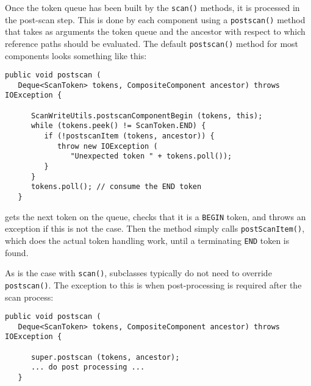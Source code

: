 \documentclass{article}
\begin{document}
Once the token queue has been built by the {\tt scan()} methods, it is
processed in the post-scan step. This is done by each component using
a {\tt postscan()} method that takes as arguments the token queue and
the ancestor with respect to which reference paths should be
evaluated. The default {\tt postscan()} method for most components
looks something like this:
\begin{lstlisting}[]
   public void postscan (
   Deque<ScanToken> tokens, CompositeComponent ancestor) throws IOException {

      ScanWriteUtils.postscanComponentBegin (tokens, this);
      while (tokens.peek() != ScanToken.END) {
         if (!postscanItem (tokens, ancestor)) {
            throw new IOException (
               "Unexpected token " + tokens.poll());
         }
      }
      tokens.poll(); // consume the END token
   }   
\end{lstlisting}
gets the next token on the queue, checks that it is a {\tt BEGIN}
token, and throws an exception if this is not the case.  Then the
method simply calls {\tt postScanItem()}, which does the actual token
handling work, until a terminating {\tt END} token is found.

As is the case with {\tt scan()}, subclasses typically do not need
to override {\tt postscan()}. The exception to this is when
post-processing is required after the scan process:
\begin{lstlisting}[]
   public void postscan (
   Deque<ScanToken> tokens, CompositeComponent ancestor) throws IOException {

      super.postscan (tokens, ancestor);
      ... do post processing ...
   }    
\end{lstlisting}
\end{document}
